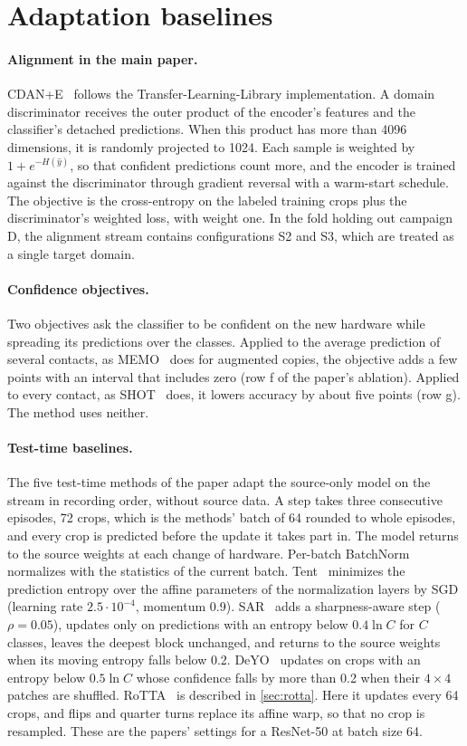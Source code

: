 \documentclass[10pt,twocolumn,letterpaper]{article}
\begin{document}
\section{Adaptation baselines}
\paragraph{Alignment in the main paper.} CDAN+E~\cite{long2018cdan} follows the Transfer-Learning-Library implementation. A domain discriminator receives the outer product of the encoder's features and the classifier's detached predictions. When this product has more than 4096 dimensions, it is randomly projected to 1024. Each sample is weighted by $1 + e^{-H(\hat y)}$, so that confident predictions count more, and the encoder is trained against the discriminator through gradient reversal with a warm-start schedule. The objective is the cross-entropy on the labeled training crops plus the discriminator's weighted loss, with weight one. In the fold holding out campaign D, the alignment stream contains configurations S2 and S3, which are treated as a single target domain.
\paragraph{Confidence objectives.} Two objectives ask the classifier to be confident on the new hardware while spreading its predictions over the classes. Applied to the average prediction of several contacts, as MEMO~\cite{zhang2022memo} does for augmented copies, the objective adds a few points with an interval that includes zero (row f of the paper's ablation). Applied to every contact, as SHOT~\cite{liang2020shot} does, it lowers accuracy by about five points (row g). The method uses neither.
\paragraph{Test-time baselines.} The five test-time methods of the paper adapt the source-only model on the stream in recording order, without source data. A step takes three consecutive episodes, 72 crops, which is the methods' batch of 64 rounded to whole episodes, and every crop is predicted before the update it takes part in. The model returns to the source weights at each change of hardware. Per-batch BatchNorm~\cite{schneider2020bn} normalizes with the statistics of the current batch. Tent~\cite{wang2021tent} minimizes the prediction entropy over the affine parameters of the normalization layers by SGD (learning rate $2.5\cdot10^{-4}$, momentum 0.9). SAR~\cite{niu2023sar} adds a sharpness-aware step ($\rho=0.05$), updates only on predictions with an entropy below $0.4\ln C$ for $C$ classes, leaves the deepest block unchanged, and returns to the source weights when its moving entropy falls below 0.2. DeYO~\cite{lee2024deyo} updates on crops with an entropy below $0.5\ln C$ whose confidence falls by more than 0.2 when their $4\times4$ patches are shuffled. RoTTA~\cite{yuan2023rotta} is described in \cref{sec:rotta}. Here it updates every 64 crops, and flips and quarter turns replace its affine warp, so that no crop is resampled. These are the papers' settings for a ResNet-50 at batch size 64.
\end{document}

